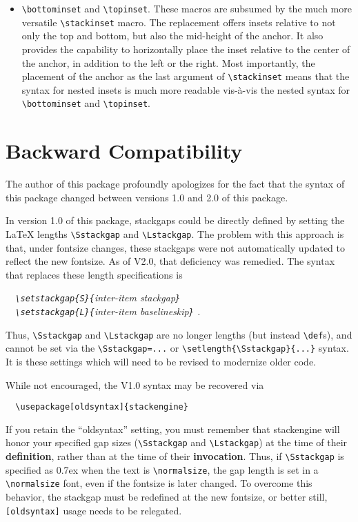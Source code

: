 \documentclass{article}
\let\vb\verb
\newcommand\margtt[1]{\marginpar{\hfill\ttfamily#1}}
\newcommand\margcmd[1]{\marginpar{\hfill\ttfamily\char'134#1}}
\begin{document}
\begin{itemize}
\item \vb|\bottominset| and \vb|\topinset|.  These
macros are subsumed by the much more versatile \vb|\stackinset| macro.
The replacement offers insets relative to not only the top and bottom,
but also the mid-height of the anchor.  It also provides the capability 
to horizontally place the inset relative to the center of the anchor,
in addition to the left or the right.  Most importantly, the placement
of the anchor as the last argument of \vb|\stackinset| means that the
syntax for nested insets is much more readable vis-\`a-vis the nested
syntax for \vb|\bottominset| and \vb|\topinset|.
\end{itemize}

\section{Backward Compatibility\label{s:bc}}

The author of this package profoundly apologizes for the fact that the
syntax of this package changed between versions 1.0 and 2.0 of this
package.  

In\margcmd{setstackgap} version 1.0 of this package, stackgaps could be
directly defined by setting the \LaTeX{} lengths \vb|\Sstackgap| and
\vb|\Lstackgap|.  The problem with this approach is that, under fontsize
changes, these stackgaps were not automatically updated to reflect the
new fontsize.  As of V2.0, that deficiency was remedied.  The syntax
that replaces these length specifications is

\itshape
\vb|  \setstackgap{S}{|inter-item stackgap\vb|}|\\
\vb|  \setstackgap{L}{|inter-item baselineskip\vb|}|  .
\upshape

Thus, \vb|\Sstackgap| and \vb|\Lstackgap| are no longer lengths (but
instead \vb|\def|s), and cannot be set via the \vb|\Sstackgap=...|
or \vb|\setlength{\Sstackgap}{...}| syntax.  It is these settings
which will need to be revised to modernize older code.

While\margtt{[oldsyntax]} not encouraged, the V1.0 syntax may be
recovered via

\vb|  \usepackage[oldsyntax]{stackengine}|

If you retain the ``oldsyntax'' setting, you must remember that
\textsf{stackengine} will honor your specified gap sizes
(\vb|\Sstackgap| and \vb|\Lstackgap|) at the time of their
\textbf{definition}, rather than at the time of their
\textbf{invocation}.  Thus, if \vb|\Sstackgap| is specified as 0.7ex
when the text is \vb|\normalsize|, the gap length is set in a
\vb|\normalsize| font, even if the fontsize is later changed.  To
overcome this behavior, the stackgap must be redefined at the new
fontsize, or better still, \vb|[oldsyntax]| usage needs to be
relegated.
\end{document}
